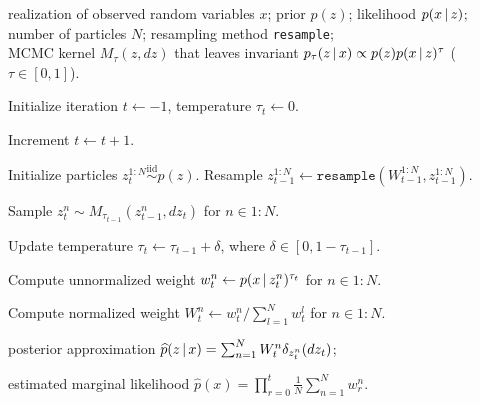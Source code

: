 \documentclass[
  12pt]{article}
\newcommand{\algorithmspace}{\vspace{3pt}}
\newcommand{\padvert}{\thinspace \vert \thinspace}
\begin{document}
\begin{algorithm}[t]
\small
\caption{\small Likelihood-tempered sequential Monte Carlo sampler (\texttt{SMCsampler})} \label{algorithm:smc}
\begin{algorithmic}
\Require realization of observed random variables $x$; prior $p(z)$; likelihood $p(x \padvert z)$; \\
\qquad\quad number of particles $N$; resampling method \texttt{resample}; \\
\qquad\quad MCMC kernel $M_\tau(z, dz)$ that leaves invariant $p_\tau(z \padvert x) \propto p(z) p(x \padvert z)^\tau$ ($\tau \in [0,1]$).

\algorithmspace

\State Initialize iteration $t \leftarrow -1$, temperature $\tau_t \leftarrow 0$.

\algorithmspace

    \State Increment $t \leftarrow t + 1$.

    \algorithmspace

        \State Initialize particles $z_t^{1:N} \overset{\text{iid}}{\sim} p(z)$.
    \Else
        \State Resample $z_{t-1}^{1:N} \leftarrow \texttt{resample}(W_{t-1}^{1:N}, z_{t-1}^{1:N})$.

        \algorithmspace

        \State Sample $z_t^n \sim M_{\tau_{t-1}}(z_{t-1}^n, dz_t)$ for $n \in 1{:}N$.
    \EndIf

    \algorithmspace

    \State Update temperature $\tau_t \leftarrow \tau_{t-1} + \delta$, where $\delta \in [0, 1{-}\tau_{t-1}]$.

    \algorithmspace

    \State Compute unnormalized weight $w_t^n \leftarrow p(x \padvert z_t^n)^{\tau_t}$ for $n \in 1{:}N$.

    \algorithmspace

    \State Compute normalized weight $W_t^n \leftarrow w_t^n / \sum_{l=1}^N w_t^l$ for $n \in 1{:}N$.
\EndWhile

\algorithmspace

\Ensure posterior approximation $\widehat{p}(z \padvert x) = \sum_{n=1}^N W_t^n \delta_{z_t^n} (dz_t)$; \\

\algorithmspace

\qquad\quad\enspace estimated marginal likelihood $\widehat{p}(x) = \prod_{r=0}^t \frac{1}{N} \sum_{n=1}^N w_r^n$.
\end{algorithmic}
\end{algorithm}
\end{document}
